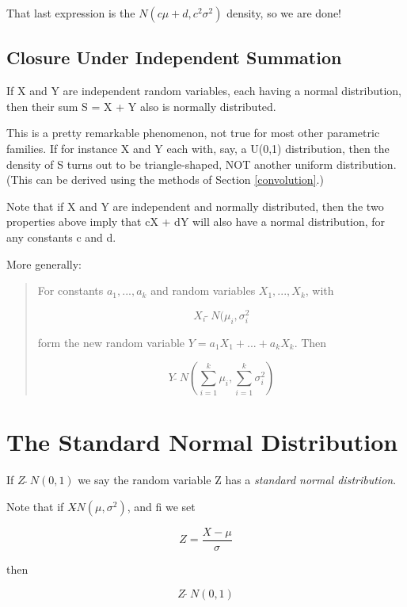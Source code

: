 That last expression is the $N(c\mu+d,c^2\sigma^2)$ density, so we are
done!

\subsection{Closure Under Independent Summation}
\label{sumindep}

If X and Y are independent random variables, each having a normal
distribution, then their sum S = X + Y also is normally distributed.

This is a pretty remarkable phenomenon, not true for most other
parametric families.  If for instance X and Y each with, say, a U(0,1)
distribution, then the density of S turns out to be triangle-shaped, NOT
another uniform distribution.  (This can be derived using the methods of
Section \ref{convolution}.)

Note that if X and Y are independent and normally distributed, then the
two properties above imply that cX + dY will also have a normal
distribution, for any constants c and d.

More generally:

\begin{quote}
For constants $a_1,...,a_k$ and random variables
$X_1,...,X_k$, with

\begin{equation}
X_i ~ \widetilde{ } ~ N(\mu_i, \sigma_i^2
\end{equation}

form the new random variable $Y = a_1 X_1 +...+ a_k X_k$.   Then

\begin{equation}
\label{lincombnormal}
Y ~ \widetilde{ } ~ N(\sum_{i=1}^k \mu_i, \sum_{i=1}^k \sigma_i^2)
\end{equation}
\end{quote}

\section{The Standard Normal Distribution}
\label{stdnorm}

\begin{definition}

If $Z ~ \widetilde{} ~ N(0,1)$ we say the random variable Z has a {\it
standard normal distribution}.

Note that if $X \widetilde{} N(\mu,\sigma^2)$, and fi we set

\begin{equation}
Z = \frac{X - \mu}{\sigma}
\end{equation}

then 

\begin{equation}
\label{zisn01}
Z ~ \widetilde{} ~ N(0,1)
\end{equation}

\end{definition}

